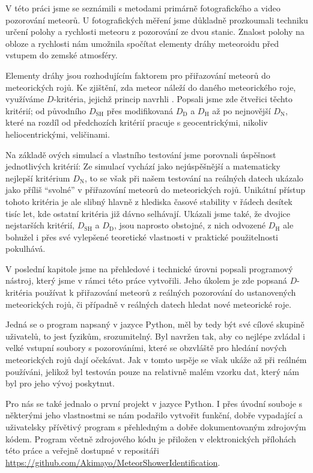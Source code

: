 V této práci jsme se seznámili s metodami primárně fotografického a video pozorování meteorů. U fotografických měření jsme důkladně prozkoumali techniku určení polohy a rychlosti meteoru z pozorování ze dvou stanic. Znalost polohy na obloze a rychlosti nám umožnila spočítat elementy dráhy meteoroidu před vstupem do zemské atmosféry.

\medskip

Elementy dráhy jsou rozhodujícím faktorem pro přiřazování meteorů do meteorických rojů. Ke zjištění, zda meteor náleží do daného meteorického roje, využíváme $D$-kritéria, jejichž princip navrhli \citeauthor{dsh}. Popsali jsme zde čtveřici těchto kritérií; od původního $D_\text{SH}$ přes modifikovaná $D_\text{D}$ a $D_\text{H}$ až po nejnovější $D_\text{N}$, které na rozdíl od předchozích kritérií pracuje s geocentrickými, nikoliv heliocentrickými, veličinami.

Na základě \citeauthor{galligan}ových simulací a vlastního testování jsme porovnali úspěšnost jednotlivých kritérií: Ze simulací vychází jako nejúspěšnější a matematicky nejlepší kritérium $D_\text{N}$, to se však při našem testování na reálných datech ukázalo jako příliš "`svolné"' v přiřazování meteorů do meteorických rojů. Unikátní přístup tohoto kritéria je ale slibný hlavně z hlediska časové stability v řádech desítek tisíc let, kde ostatní kritéria již dávno selhávají. Ukázali jsme také, že dvojice nejstarších kritérií, $D_\text{SH}$ a $D_\text{D}$, jsou naprosto obstojné, z nich odvozené $D_\text{H}$ ale bohužel i přes své vylepšené teoretické vlastnosti v praktické použitelnosti pokulhává.

\medskip

V poslední kapitole jsme na přehledové i technické úrovni popsali programový nástroj, který jsme v rámci této práce vytvořili. Jeho úkolem je zde popsaná $D$-kritéria používat k přiřazování meteorů z reálných pozorování do ustanovených meteorických rojů, či případně v reálných datech hledat nové meteorické roje.

Jedná se o program napsaný v jazyce Python, měl by tedy být své cílové skupině uživatelů, to jest fyzikům, srozumitelný. Byl navržen tak, aby co nejlépe zvládal i velké vstupní soubory s pozorováními, které se obzvláště pro hledání nových meteorických rojů dají očekávat. Jak v tomto uspěje se však ukáže až při reálném používáni, jelikož byl testován pouze na relativně malém vzorku dat, který nám byl pro jeho vývoj poskytnut.

\smallskip

Pro nás se také jednalo o první projekt v jazyce Python. I přes úvodní souboje s některými jeho vlastnostmi se nám podařilo vytvořit funkční, dobře vypadající a uživatelsky přívětivý program s přehledným a dobře dokumentovaným zdrojovým kódem. Program včetně zdrojového kódu je přiložen v elektronických přílohách této práce a veřejně dostupné v repositáři \\\href{https://github.com/Akimayo/MeteorShowerIdentification}{https://github.com/Akimayo/MeteorShowerIdentification}.